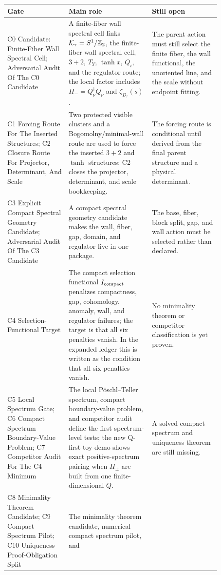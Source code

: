 \documentclass[11pt]{article}
\begin{document}
\begin{center}
\small
\begin{tabular}{p{0.25\linewidth}p{0.34\linewidth}p{0.28\linewidth}}
\toprule
\textbf{Gate} & \textbf{Main role} & \textbf{Still open}\\
\midrule
C0 Candidate: Finite-Fiber Wall Spectral Cell; Adversarial Audit Of The C0 Candidate &
A finite-fiber wall spectral cell links ${\cal K}_\tau=S^1/\mathbb Z_2$, the
finite-fiber wall spectral cell, $3+2$, $T_Y$, $\tanh x$, $Q_i$, and the
regulator route; the local factor includes $H_-=Q_\nu^\dagger Q_\nu$ and
$\zeta_{D_\tau}(s)$. &
The parent action must still select the finite fiber, the wall functional, the
unoriented line, and the scale without endpoint fitting.\\
C1 Forcing Route For The Inserted Structures; C2 Closure Route For Projector, Determinant, And Scale &
Two protected visible clusters and a Bogomolny/minimal-wall route are used to
force the inserted $3+2$ and $\tanh$ structures; C2 closes the projector,
determinant, and scale bookkeeping. &
The forcing route is conditional until derived from the final parent structure
and a physical determinant.\\
C3 Explicit Compact Spectral Geometry Candidate; Adversarial Audit Of The C3 Candidate &
A compact spectral geometry candidate makes the wall, fiber, gap, domain, and
regulator live in one package. &
The base, fiber, block split, gap, and wall action must be selected rather than
declared.\\
C4 Selection-Functional Target &
The compact selection functional $I_{\rm compact}$ penalizes compactness,
gap, cohomology, anomaly, wall, and regulator failures; the target is that all
six penalties vanish.  In the expanded ledger this is written as the condition
that all six penalties vanish. &
No minimality theorem or competitor classification is yet proven.\\
C5 Local Spectrum Gate; C6 Compact Spectrum Boundary-Value Problem; C7 Competitor Audit For The C4 Minimum &
The local Pöschl--Teller spectrum, compact boundary-value problem, and
competitor audit define the first spectrum-level tests; the new Q-first toy
demo shows exact positive-spectrum pairing when $H_\pm$ are built from one
finite-dimensional $Q$. &
A solved compact spectrum and uniqueness theorem are still missing.\\
C8 Minimality Theorem Candidate; C9 Compact Spectrum Pilot; C10 Uniqueness Proof-Obligation Split &
The minimality theorem candidate, numerical compact spectrum pilot, and

\end{tabular}
\end{center}
\end{document}
